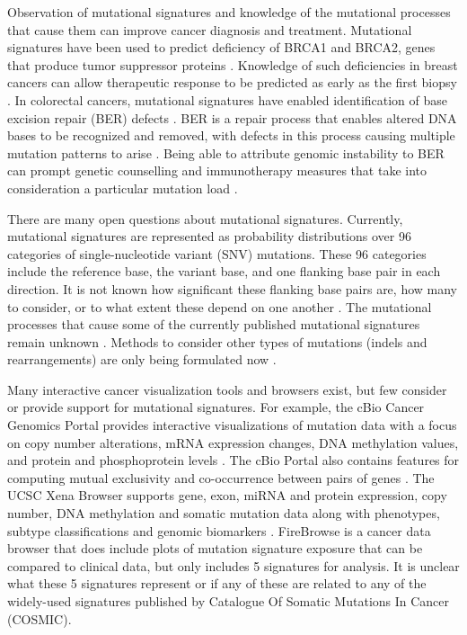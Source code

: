 \documentclass[12pt, letterpaper]{article}
\begin{document}
Observation of mutational signatures and knowledge of the mutational processes that cause them can improve cancer diagnosis and treatment. 
Mutational signatures have been used to predict deficiency of BRCA1 and BRCA2, genes that produce tumor suppressor proteins \citep{domchek2010association}.
Knowledge of such deficiencies in breast cancers can allow therapeutic response to be predicted as early as the first biopsy \citep{davies2017hrdetect}.
In colorectal cancers, mutational signatures have enabled identification of base excision repair (BER) defects \citep{pilati2017mutational}. 
BER is a repair process that enables altered DNA bases to be recognized and removed, with defects in this process causing multiple mutation patterns to arise \citep{helleday2014mechanisms}.
Being able to attribute genomic instability to BER can prompt genetic counselling and immunotherapy measures that take into consideration a particular mutation load \citep{pilati2017mutational}.

There are many open questions about mutational signatures. 
Currently, mutational signatures are represented as probability distributions over 96 categories of single-nucleotide variant (SNV) mutations.
These 96 categories include the reference base, the variant base, and one flanking base pair in each direction. 
It is not known how significant these flanking base pairs are, how many to consider, or to what extent these depend on one another \citep{shiraishi2015simple}.
The mutational processes that cause some of the currently published mutational signatures remain unknown \citep{alexandrov2013signatures}.
Methods to consider other types of mutations (indels and rearrangements) are only being formulated now \citep{zou2018validating}.

Many interactive cancer visualization tools and browsers exist, but few consider or provide support for mutational signatures. 
For example, the cBio Cancer Genomics Portal provides interactive visualizations of mutation data with a focus on copy number alterations, mRNA expression changes, DNA methylation values, and protein and phosphoprotein levels \citep{cerami2012cbio,gao2013integrative}.
The cBio Portal also contains features for computing mutual exclusivity and co-occurrence between pairs of genes \citep{cerami2012cbio,gao2013integrative}.
The UCSC Xena Browser supports gene, exon, miRNA and protein expression, copy number, DNA methylation and somatic mutation data along with phenotypes, subtype classifications and genomic biomarkers \citep{goldman2014ucsc,goldman2016ucsc}.
FireBrowse is a cancer data browser that does include plots of mutation signature exposure that can be compared to clinical data, but only includes 5 signatures for analysis.
It is unclear what these 5 signatures represent or if any of these are related to any of the widely-used signatures published by Catalogue Of Somatic Mutations In Cancer (COSMIC).
\end{document}
